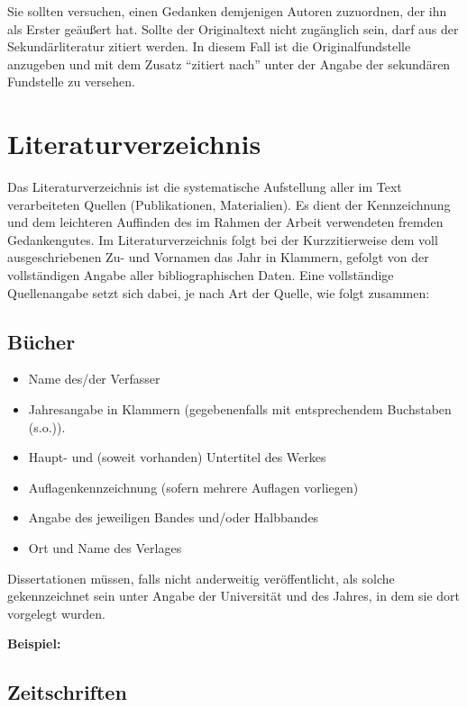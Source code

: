 \documentclass[a4paper,12pt]{scrartcl} %
\begin{document}
Sie sollten versuchen, einen Gedanken demjenigen Autoren zuzuordnen, der ihn als Erster geäußert hat. Sollte der Originaltext nicht zugänglich sein, darf aus der Sekundärliteratur zitiert werden. In diesem Fall ist die Originalfundstelle anzugeben und mit dem Zusatz ``zitiert nach'' unter der Angabe der sekundären Fundstelle zu versehen.

\clearpage

\section{Literaturverzeichnis}

Das Literaturverzeichnis ist die systematische Aufstellung aller im Text verarbeiteten Quellen (Publikationen, Materialien). Es dient der Kennzeichnung und dem leichteren Auffinden des im Rahmen der Arbeit verwendeten fremden Gedankengutes. Im Literaturverzeichnis folgt bei der Kurzzitierweise dem voll ausgeschriebenen Zu- und Vornamen das Jahr in Klammern, gefolgt von der vollständigen Angabe aller bibliographischen Daten. Eine vollständige Quellenangabe setzt sich dabei, je nach Art der Quelle, wie folgt zusammen:

\subsection{Bücher}

\begin{itemize}
\item Name des/der Verfasser
\item Jahresangabe in Klammern (gegebenenfalls mit entsprechendem Buchstaben (s.o.)).
\item Haupt- und (soweit vorhanden) Untertitel des Werkes
\item Auflagenkennzeichnung (sofern mehrere Auflagen vorliegen)
\item Angabe des jeweiligen Bandes und/oder Halbbandes
\item Ort und Name des Verlages
\end{itemize}

Dissertationen müssen, falls nicht anderweitig veröffentlicht, als solche gekennzeichnet sein unter Angabe der
Universität und des Jahres, in dem sie dort vorgelegt wurden.

\textbf{Beispiel:}


\subsection{Zeitschriften}
\end{document}
